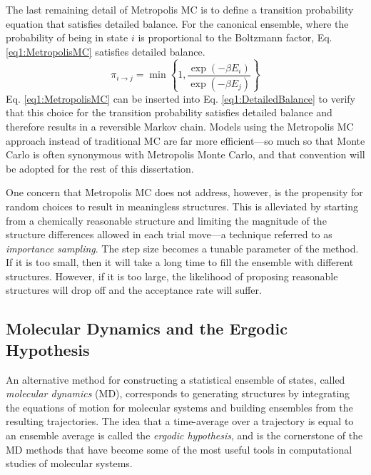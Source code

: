 The last remaining detail of Metropolis MC is to define a transition probability
equation that satisfies detailed balance. For the canonical ensemble, where the
probability of being in state $i$ is proportional to the Boltzmann factor, Eq.
\ref{eq1:MetropolisMC} satisfies detailed balance.
\begin{equation}
   \pi_{i \rightarrow j} = \min \left \lbrace 1, \frac {\exp ( -\beta E _ i )}
                         {\exp ( -\beta E _ j ) } \right \rbrace
   \label{eq1:MetropolisMC}
\end{equation}
Eq. \ref{eq1:MetropolisMC} can be inserted into Eq. \ref{eq1:DetailedBalance} to
verify that this choice for the transition probability satisfies detailed
balance and therefore results in a reversible Markov chain. Models using the
Metropolis MC approach instead of traditional MC are far more efficient---so
much so that Monte Carlo is often synonymous with Metropolis Monte Carlo,
\cite{Tuckerman_Book_StatMech_TheoryAndSim,Leach_Book_MolModel_2001} and that
convention will be adopted for the rest of this dissertation.

One concern that Metropolis MC does not address, however, is the propensity for
random choices to result in meaningless structures. This is alleviated by
starting from a chemically reasonable structure and limiting the magnitude of
the structure differences allowed in each trial move---a technique referred to
as \emph{importance sampling}. The step size becomes a tunable parameter of the
method. If it is too small, then it will take a long time to fill the ensemble
with different structures. However, if it is too large, the likelihood of
proposing reasonable structures will drop off and the acceptance rate will
suffer.

\subsection{Molecular Dynamics and the Ergodic Hypothesis}

An alternative method for constructing a statistical ensemble of states, called
\emph{molecular dynamics} (MD), corresponds to generating structures by
integrating the equations of motion for molecular systems and building ensembles
from the resulting trajectories. The idea that a time-average over a trajectory
is equal to an ensemble average is called the \emph{ergodic hypothesis}, and is
the cornerstone of the MD methods that have become some of the most useful tools
in computational studies of molecular systems.

